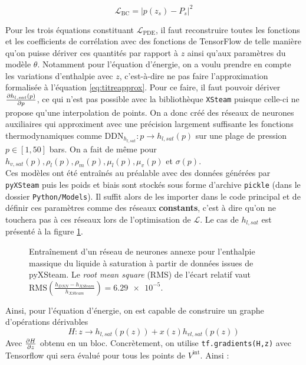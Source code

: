 \begin{equation}
    \mathcal{L}_{\text{BC}} = \left| p(z_s) - P_s\right|^2
\end{equation}

Pour les trois équations constituant $\mathcal{L}_{\text{PDE}}$, il faut reconstruire toutes les fonctions et les coefficients de corrélation avec des fonctions de TensorFlow de telle manière qu'on puisse dériver ces quantités par rapport à $z$ ainsi qu'aux paramètres du modèle $\theta$. Notamment pour l'équation d'énergie, on a voulu prendre en compte les variations d'enthalpie avec $z$, c'est-à-dire ne pas faire l'approximation formalisée à l'équation \ref{eq:titreapprox}. Pour ce faire, il faut pouvoir dériver $\pder[h_{l,sat}(p)]{p}$, ce qui n'est pas possible avec la bibliothèque \verb|XSteam| puisque celle-ci ne propose qu'une interpolation de points. On a donc créé des réseaux de neurones auxiliaires qui approximent avec une précision largement suffisante les fonctions thermodynamiques comme $\text{DDN}_{h_{l,sat}} : p \rightarrow h_{l,sat}(p)$ sur une plage de pression $p \in[1, 50]$ bars. On a fait de même pour $h_{v,sat}(p),\rho_l(p),\rho_m(p),\mu_l(p),\mu_v(p)$ et $\sigma(p)$.\\

Ces modèles ont été entraînés au préalable avec des données générées par \verb|pyXSteam| puis les poids et biais sont stockés sous forme d'archive \verb|pickle| (dans le dossier \verb|Python/Models|). Il suffit alors de les importer dans le code principal et de définir ces paramètres comme des réseaux \textbf{constants}, c'est à dire qu'on ne touchera pas à ces réseaux lors de l'optimisation de $\mathcal{L}$. Le cas de $h_{l,sat}$ est présenté à la figure \ref{fig:DNN_enthalpy}.\\

\begin{figure}
    \centering
    \resizebox{0.55\linewidth}{!}{}
    \caption{Entraînement d'un réseau de neurones annexe pour l'enthalpie massique du liquide à saturation à partir de données issues de pyXSteam. Le \textit{root mean square} (RMS) de l'écart relatif vaut $ \text{RMS}\left(\frac{h_{DNN}-h_{XSteam}}{h_{XSteam}}\right)  = \num{6.29e-5}$.}
    \label{fig:DNN_enthalpy}
\end{figure}

Ainsi, pour l'équation d'énergie, on est capable de construire un graphe d'opérations dérivables 
\begin{equation}
    H : z \rightarrow h_{l,sat}(p(z)) + x(z)h_{vl,sat}(p(z))
\end{equation}
Avec $\pder[H]{z}$ obtenu en un bloc. Concrètement, on utilise \verb|tf.gradients(H,z)| avec Tensorflow qui sera évalué pour tous les points de $V^{\text{int}}$. Ainsi :

